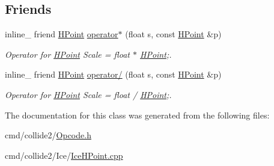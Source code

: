 \subsection*{Friends}
\begin{DoxyCompactItemize}
\item 
inline\+\_\+ friend \hyperlink{classOpcode_1_1HPoint}{H\+Point} \hyperlink{classOpcode_1_1HPoint_a1bf5d9b145d44fedc8cf73ffcd3ba4ce}{operator$\ast$} (float s, const \hyperlink{classOpcode_1_1HPoint}{H\+Point} \&p)\hypertarget{classOpcode_1_1HPoint_a1bf5d9b145d44fedc8cf73ffcd3ba4ce}{}\label{classOpcode_1_1HPoint_a1bf5d9b145d44fedc8cf73ffcd3ba4ce}

\begin{DoxyCompactList}\small\item\em Operator for \hyperlink{classOpcode_1_1HPoint}{H\+Point} Scale = float $\ast$ \hyperlink{classOpcode_1_1HPoint}{H\+Point};. \end{DoxyCompactList}\item 
inline\+\_\+ friend \hyperlink{classOpcode_1_1HPoint}{H\+Point} \hyperlink{classOpcode_1_1HPoint_a55dfa9a54972eb6849952bf355ebca45}{operator/} (float s, const \hyperlink{classOpcode_1_1HPoint}{H\+Point} \&p)\hypertarget{classOpcode_1_1HPoint_a55dfa9a54972eb6849952bf355ebca45}{}\label{classOpcode_1_1HPoint_a55dfa9a54972eb6849952bf355ebca45}

\begin{DoxyCompactList}\small\item\em Operator for \hyperlink{classOpcode_1_1HPoint}{H\+Point} Scale = float / \hyperlink{classOpcode_1_1HPoint}{H\+Point};. \end{DoxyCompactList}\end{DoxyCompactItemize}


The documentation for this class was generated from the following files\+:\begin{DoxyCompactItemize}
\item 
cmd/collide2/\hyperlink{Opcode_8h}{Opcode.\+h}\item 
cmd/collide2/\+Ice/\hyperlink{IceHPoint_8cpp}{Ice\+H\+Point.\+cpp}\end{DoxyCompactItemize}

